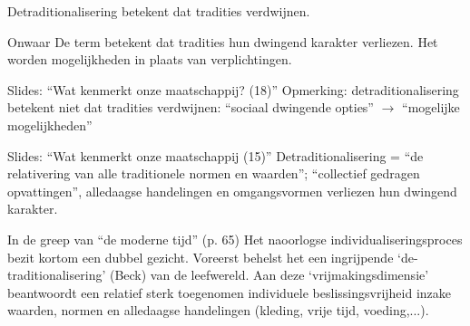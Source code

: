 \documentclass[main.tex]{subfiles}
\begin{document}
\begin{examenvraag}
    \begin{stelling}
        Detraditionalisering betekent dat tradities verdwijnen.
    \end{stelling}

    \begin{stelling-antwoord}{Onwaar}
        De term betekent dat tradities hun dwingend karakter verliezen. Het worden mogelijkheden in plaats van verplichtingen.
        \begin{citaat}{Slides: ``Wat kenmerkt onze maatschappij? (18)''}
            Opmerking: detraditionalisering betekent niet dat tradities verdwijnen: “sociaal dwingende opties” $\rightarrow$ “mogelijke mogelijkheden”
        \end{citaat}
        \begin{citaat}{Slides: ``Wat kenmerkt onze maatschappij (15)''}
            Detraditionalisering = “de relativering van alle traditionele normen en waarden”; “collectief gedragen opvattingen”, alledaagse handelingen en omgangsvormen verliezen hun dwingend karakter.
        \end{citaat}
        \begin{citaat}{In de greep van ``de moderne tijd'' (p. 65)}
            Het naoorlogse individualiseringsproces bezit kortom een dubbel gezicht.
            Voreerst behelst het een ingrijpende `de-traditionalisering' (Beck) van de leefwereld.
            Aan deze `vrijmakingsdimensie' beantwoordt een relatief sterk toegenomen individuele beslissingsvrijheid inzake waarden, normen en alledaagse handelingen (kleding, vrije tijd, voeding,...).
        \end{citaat}
    \end{stelling-antwoord}
\end{examenvraag}
	
\end{document}
